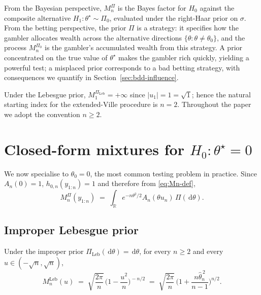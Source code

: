 \documentclass[12pt, a4paper]{report}
\newcommand{\dd}{\,\mathrm{d}}
\newcommand{\Leb}{\mathrm{Leb}}
\newcommand{\1}{\mathbf{1}}
\begin{document}
From the Bayesian perspective, \(M_n^{\Pi}\) is
the Bayes factor for \(H_0\) against the composite alternative
\(H_1:\theta^\star\sim\Pi_0\), evaluated under the right-Haar prior on
\(\sigma\). From the betting perspective, the prior \(\Pi\) is a strategy: it specifies how the gambler allocates wealth across the alternative directions \(\{\theta:\theta\neq\theta_0\}\), and the
process \(M_n^{\Pi_0}\) is the gambler's accumulated wealth from this
strategy. A prior concentrated on the true value of \(\theta^\star\)
makes the gambler rich quickly, yielding a powerful test; a misplaced
prior corresponds to a bad betting strategy, with consequences we
quantify in Section~\ref{sec:bdd-influence}.

\begin{remark}\label{rem:start-n2}
Under the Lebesgue prior, \(M_1^{\Pi_{\Leb}}=+\infty\) since
\(|u_1|=1=\sqrt 1\); hence the natural starting index for the
extended-Ville procedure is \(n=2\). Throughout the paper we adopt
the convention \(n\geq 2\).
\end{remark}

\section{Closed-form mixtures for $H_0:\theta^\star=0$}\label{sec:closedform}

We now specialise to \(\theta_0=0\), the most common testing problem
in practice. Since \(A_n(0)=1\),
\(h_{0,n}(y_{1:n})=1\) and therefore from \eqref{eq:Mn-def},
\begin{equation}\label{eq:Mn-zero}
   M_n^{\Pi}(y_{1:n})\;=\;\int_\mathbb{R} e^{-n\theta^2/2}A_n(\theta u_n)
                     \,\Pi(\dd\theta).
\end{equation}

\subsection{Improper Lebesgue prior}\label{ssec:Leb}

\begin{theorem}\label{thm:Mn-Leb}
Under the improper prior \(\Pi_{\Leb}(\dd\theta)=\dd\theta\), for
every \(n\geq 2\) and every \(u\in(-\sqrt n,\sqrt n)\),
\begin{equation}\label{eq:Mn-Leb}
  M_n^{\Leb}(u)\;=\;\sqrt{\frac{2\pi}{n}}\,
  \biggl(1-\frac{u^2}{n}\biggr)^{\!-n/2}
  \;=\;\sqrt{\frac{2\pi}{n}}\,
  \biggl(1+\frac{n\widehat\theta_n^{\,2}}{n-1}\biggr)^{\!n/2}.
\end{equation}
\end{theorem}
\end{document}
